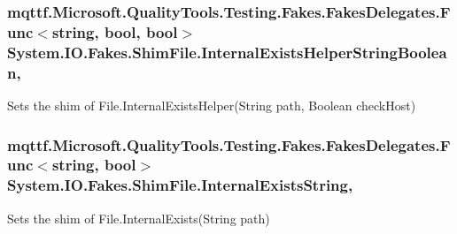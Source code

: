 \hypertarget{class_system_1_1_i_o_1_1_fakes_1_1_shim_file_aac742cec73025df6089bd5f146f4af23}{
\subsubsection[{Internal\-Exists\-Helper\-String\-Boolean}]{\setlength{\rightskip}{0pt plus 5cm}mqttf.\-Microsoft.\-Quality\-Tools.\-Testing.\-Fakes.\-Fakes\-Delegates.\-Func$<$string, bool, bool$>$ System.\-I\-O.\-Fakes.\-Shim\-File.\-Internal\-Exists\-Helper\-String\-Boolean\hspace{0.3cm}{\ttfamily [static]}, {\ttfamily [set]}}}\label{class_system_1_1_i_o_1_1_fakes_1_1_shim_file_aac742cec73025df6089bd5f146f4af23}


Sets the shim of File.\-Internal\-Exists\-Helper(\-String path, Boolean check\-Host)

\hypertarget{class_system_1_1_i_o_1_1_fakes_1_1_shim_file_a98b9cdf6f923c5bf5ec6400e7895f22b}{
\subsubsection[{Internal\-Exists\-String}]{\setlength{\rightskip}{0pt plus 5cm}mqttf.\-Microsoft.\-Quality\-Tools.\-Testing.\-Fakes.\-Fakes\-Delegates.\-Func$<$string, bool$>$ System.\-I\-O.\-Fakes.\-Shim\-File.\-Internal\-Exists\-String\hspace{0.3cm}{\ttfamily [static]}, {\ttfamily [set]}}}\label{class_system_1_1_i_o_1_1_fakes_1_1_shim_file_a98b9cdf6f923c5bf5ec6400e7895f22b}


Sets the shim of File.\-Internal\-Exists(\-String path)

